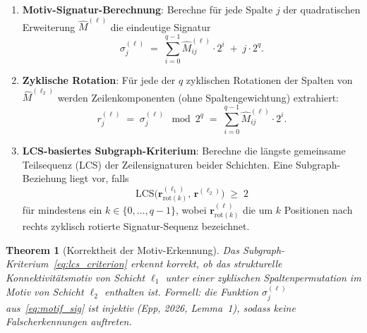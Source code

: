 \documentclass[12pt, a4paper, openany]{report}
\newtheorem{theorem}{Theorem}[chapter]
\begin{document}
\begin{enumerate}[label=(\Roman*)]
  \item \textbf{Motiv-Signatur-Berechnung}: Berechne für jede Spalte $j$
    der quadratischen Erweiterung $\hat{M}^{(\ell)}$ die eindeutige
    Signatur
    \begin{equation}
      \label{eq:motif_sig}
      \sigma_j^{(\ell)}
      \;=\;
      \sum_{i=0}^{q-1} \hat{M}^{(\ell)}_{ij} \cdot 2^i
      \;+\; j \cdot 2^q.
    \end{equation}
  \item \textbf{Zyklische Rotation}: Für jede der $q$ zyklischen
    Rotationen der Spalten von $\hat{M}^{(\ell_2)}$ werden
    Zeilenkomponenten (ohne Spalten\-gewichtung) extrahiert:
    \begin{equation}
      \label{eq:row_sig}
      r_j^{(\ell)}
      \;=\; \sigma_j^{(\ell)} \!\!\mod 2^q
      \;=\; \sum_{i=0}^{q-1} \hat{M}^{(\ell)}_{ij} \cdot 2^i.
    \end{equation}
  \item \textbf{LCS-basiertes Subgraph-Kriterium}: Berechne die
    längste gemeinsame Teilsequenz (LCS) der Zeilen\-signaturen beider
    Schichten.  Eine Subgraph-Beziehung liegt vor, falls
    \begin{equation}
      \label{eq:lcs_criterion}
      \mathrm{LCS}\!\bigl(\bm{r}^{(\ell_1)}_{\mathrm{rot}(k)},\,
                          \bm{r}^{(\ell_2)}\bigr)
      \;\geq\; 2
    \end{equation}
    für mindestens ein $k \in \{0,\ldots,q-1\}$, wobei
    $\bm{r}^{(\ell)}_{\mathrm{rot}(k)}$ die um $k$ Positionen nach rechts
    zyklisch rotierte Signatur-Sequenz bezeichnet.
\end{enumerate}

\begin{theorem}[Korrektheit der Motiv-Erkennung]
\label{thm:motif_correctness}
Das Subgraph-Kriterium~\eqref{eq:lcs_criterion} erkennt korrekt, ob das
strukturelle Konnektivitätsmotiv von Schicht $\ell_1$ unter einer zyklischen
Spaltenpermutation im Motiv von Schicht $\ell_2$ enthalten ist.  Formell: die
Funktion $\sigma_j^{(\ell)}$ aus~\eqref{eq:motif_sig} ist injektiv (Epp, 2026,
Lemma~1), sodass keine Falscherkennungen auftreten.
\end{theorem}
\end{document}
